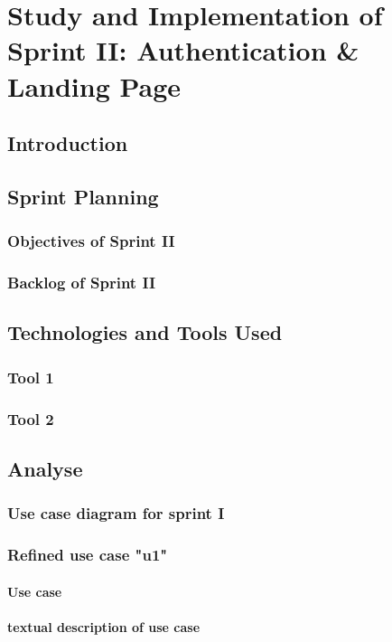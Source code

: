 \chapter[Sprint II]{Study and Implementation of Sprint II: Authentication \& Landing Page}

\minitoc
\section{Introduction}
\section{Sprint Planning}
\subsection{Objectives of Sprint II}
\subsection{Backlog of Sprint II}
\section{Technologies and Tools Used}
\subsection{Tool 1}
\subsection{Tool 2}

\section{Analyse}
\subsection{Use case diagram for sprint I}
\subsection{Refined use case "u1"}
\subsubsection{Use case}
\subsubsection{textual description of use case}
